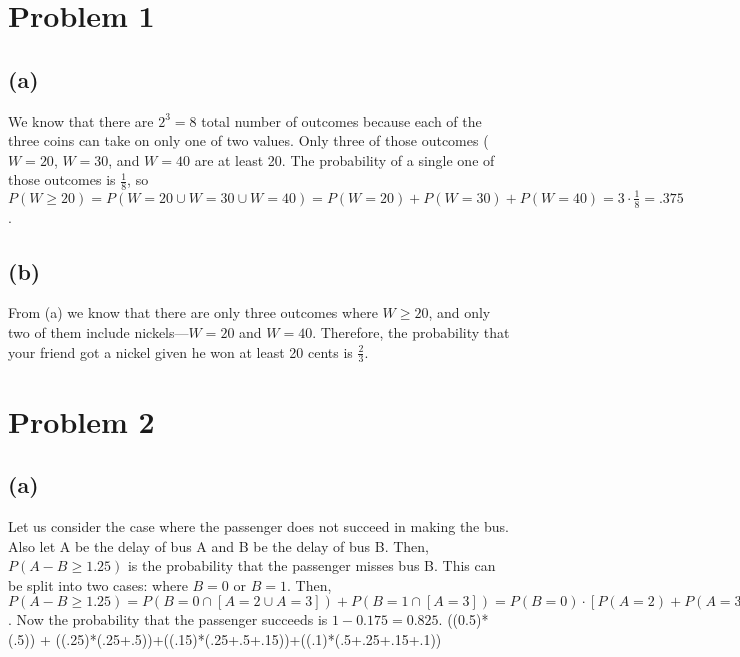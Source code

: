 \documentclass{article}
\begin{document}
\thispagestyle{fancy}

\list{} \item \endlist

\section*{Problem 1} 

\subsection*{(a)}

We know that there are $2^{3} = 8$ total number of outcomes because each of the
three coins can take on only one of two values. Only three of those outcomes
($W = 20$, $W = 30$, and $W=40$ are at least 20. The probability of a single
one of those outcomes is $\frac{1}{8}$, so $P(W \geq 20)=P( W = 20 \cup W=30
\cup W=40 )=P( W = 20 ) + P( W = 30 ) + P( W = 40 ) = 3 \cdot \frac{1}{8} =
.375$.

\subsection*{(b)}

From (a) we know that there are only three outcomes where $W \geq 20$, and only
two of them include nickels---$W = 20$ and $W = 40$. Therefore, the probability
that your friend got a nickel given he won at least 20 cents is $\frac{2}{3}$.

\section*{Problem 2}

\subsection*{(a)}

Let us consider the case where the passenger does not succeed in making the
bus. Also let A be the delay of bus A and B be the delay of bus B. Then, $P(A -
B \geq 1.25)$ is the probability that the passenger misses bus B. This can be
split into two cases: where $B = 0$ or $B = 1$. Then, $P( A - B \geq 1.25 ) =
P( B = 0 \cap [A = 2 \cup A = 3] ) + P( B = 1 \cap [A = 3]) = P(B=0)\cdot [P(A
= 2 ) + P( A = 3 ) ] + P(B=1)\cdot P(A = 3 ) = 0.5\cdot (0.15 + 0.1) + 0.5\cdot
0.1 = 0.175$. Now the probability that the passenger succeeds is $1 - 0.175 =
0.825$.
((0.5)*(.5)) + ((.25)*(.25+.5))+((.15)*(.25+.5+.15))+((.1)*(.5+.25+.15+.1))
\end{document}
